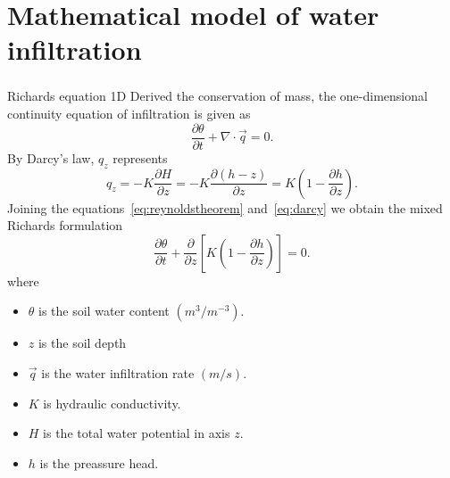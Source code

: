 \section{Mathematical model of water infiltration}

\begin{frame}
	\frametitle{\secname}

	\begin{block}{Richards equation 1D}
		Derived the \alert{conservation of mass},
		the one-dimensional continuity equation of infiltration is given
		as
		\begin{equation}\label{eq:reynoldstheorem}
			\frac{\partial\theta}{\partial t}+
			\nabla\cdot\vec{q}=0.
		\end{equation}
		By \alert{Darcy's law}, $q_{z}$ represents
		\begin{equation}\label{eq:darcy}
			q_{z}=
			-K\frac{\partial H}{\partial z}=
			-K\frac{\partial(h-z)}{\partial z}=
			K\left(1-\frac{\partial h}{\partial z}\right).
		\end{equation}
		Joining the equations~\eqref{eq:reynoldstheorem} and~\eqref{eq:darcy}
		we obtain the \alert{mixed Richards formulation}
		\begin{equation*}
			\frac{\partial\theta}{\partial t}+
			\frac{\partial}{\partial z}
			\left[K\left(1-\frac{\partial h}{\partial z}\right)\right]=0.
		\end{equation*}
		where\vspace*{-0.4cm}
		\begin{multicols}{2}
			\begin{itemize}
				\item $\theta$ is the soil water content $\left(m^3/m^{-3}\right)$.
				\item $z$ is the soil depth
				\item $\vec{q}$ is the water infiltration rate $\left(m/s\right)$.
				\item $K$ is hydraulic conductivity.
				\item $H$ is the total water potential in axis $z$.
				\item $h$ is the preassure head.
			\end{itemize}
		\end{multicols}
	\end{block}

\end{frame}

